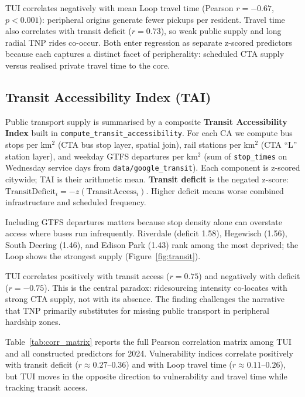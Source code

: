 \documentclass[10pt, a4paper]{article}
\begin{document}
TUI correlates negatively with mean Loop travel time (Pearson $r=-0.67$, $p<0.001$): peripheral origins generate fewer pickups per resident. Travel time also correlates with transit deficit ($r=0.73$), so weak public supply and long radial TNP rides co-occur. Both enter regression as separate z-scored predictors because each captures a distinct facet of peripherality: scheduled CTA supply versus realised private travel time to the core.

\subsection{Transit Accessibility Index (TAI)}
Public transport supply is summarised by a composite \textbf{Transit Accessibility Index} built in \texttt{compute\_transit\_accessibility}. For each CA we compute bus stops per km$^2$ (CTA bus stop layer, spatial join), rail stations per km$^2$ (CTA ``L'' station layer), and weekday GTFS departures per km$^2$ (sum of \texttt{stop\_times} on Wednesday service days from \texttt{data/google\_transit}). Each component is z-scored citywide; TAI is their arithmetic mean. \textbf{Transit deficit} is the negated z-score: $\mathrm{TransitDeficit}_i = -z(\mathrm{TransitAccess}_i)$. Higher deficit means worse combined infrastructure and scheduled frequency.

Including GTFS departures matters because stop density alone can overstate access where buses run infrequently. Riverdale (deficit 1.58), Hegewisch (1.56), South Deering (1.46), and Edison Park (1.43) rank among the most deprived; the Loop shows the strongest supply (Figure~\ref{fig:transit}).

TUI correlates positively with transit access ($r=0.75$) and negatively with deficit ($r=-0.75$). This is the central paradox: ridesourcing intensity co-locates with strong CTA supply, not with its absence. The finding challenges the narrative that TNP primarily substitutes for missing public transport in peripheral hardship zones.

Table~\ref{tab:corr_matrix} reports the full Pearson correlation matrix among TUI and all constructed predictors for 2024. Vulnerability indices correlate positively with transit deficit ($r \approx 0.27$--$0.36$) and with Loop travel time ($r \approx 0.11$--$0.26$), but TUI moves in the opposite direction to vulnerability and travel time while tracking transit access.
\end{document}
